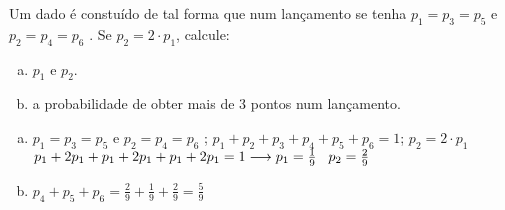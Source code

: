 \begin{ex}
 Um dado é constuído de tal forma  que num lançamento se tenha $p_1=p_3=p_5$ e $p_2=p_4=p_6$ .  Se $p_2= 2\cdot p_1$, calcule:
    \begin{enumerate}[(a)]
    \item $p_1$ e $p_2$.
    \item a probabilidade de obter mais de 3 pontos num lançamento.
    \end{enumerate}
      \begin{sol}
       \phantom{A}
         \begin{enumerate}  [(a)]
            \item $p_1=p_3=p_5$ e $p_2=p_4=p_6$ ;\hspace{0,3cm} $p_1+p_2+p_3+p_4+p_5+p_6=1$; \hspace{0,3cm} $p_2 =  2 \cdot p_1$\\ 
            $p_1+2p_1+p_1+2p_1+p_1+2p_1=1 \longrightarrow p_1=\frac{1}{9}\hspace{0.3cm}p_2=\frac{2}{9}$
            \item $p_4+p_5+p_6 = \frac{2}{9}+\frac{1}{9}+\frac{2}{9}=\frac{5}{9}$
         \end{enumerate}
      \end{sol}
\end{ex}